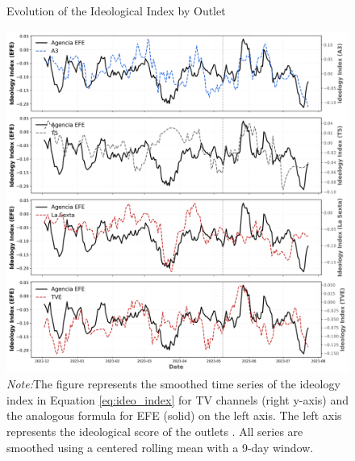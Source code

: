 \documentclass[12pt]{article}
\begin{document}
\begin{figure}[!htb]
	\caption{Evolution of the Ideological Index by Outlet}
	\centering
	\includegraphics[width=150mm]{figures/tv_vs_efe_net_diff_by_channel}
	\caption*{\small \textit{Note:}The figure represents the smoothed time series of the ideology index in Equation \eqref{eq:ideo_index} for TV channels (right y-axis) and the analogous formula for  EFE (solid) on the left axis. The left axis represents the ideological score of the outlets . All series are smoothed using a centered rolling mean with a 9-day window.}
	\label{fig:net_tone_by_channel}
\end{figure}
\end{document}
